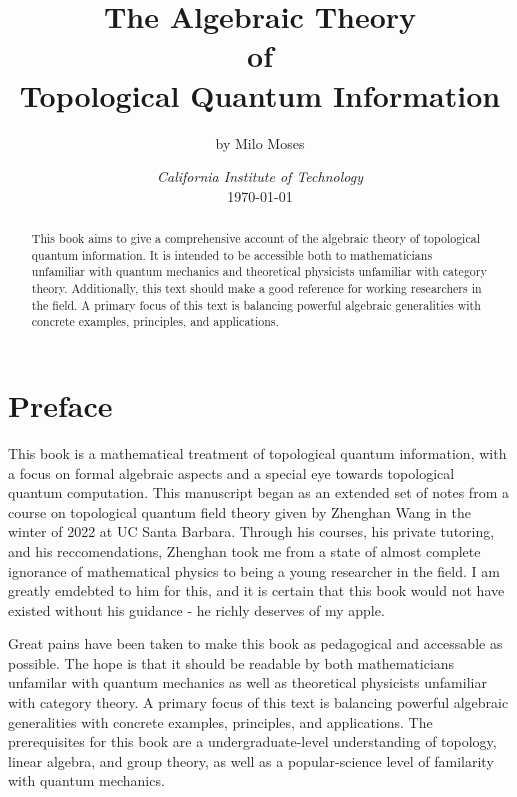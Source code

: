 \documentclass{article}
\title{The Algebraic Theory\\ of \\ Topological Quantum Information}
\author{by Milo Moses}
\date{\textit{California Institute of Technology} \\ [2ex] \today}
\theoremstyle{definition}
\newcommand{\0}{\left|0\right>}
\newcommand{\1}{\left|1\right>}
\numberwithin{figure}{section}
\begin{document}
\maketitle


\begin{abstract}
This book aims to give a comprehensive account of the algebraic theory of topological quantum information. It is intended to be accessible both to mathematicians unfamiliar with quantum mechanics and theoretical physicists unfamiliar with category theory. Additionally, this text should make a good reference for working researchers in the field. A primary focus of this text is balancing powerful algebraic generalities with concrete examples, principles, and applications.
\end{abstract}


\newpage

\tableofcontents

\newpage


\section{Preface}
\label{Preface}

This book is a mathematical treatment of topological quantum information, with a focus on formal algebraic aspects and a special eye towards topological quantum computation. This manuscript began as an extended set of notes from a course on topological quantum field theory given by Zhenghan Wang in the winter of 2022 at UC Santa Barbara. Through his courses, his private tutoring, and his reccomendations, Zhenghan took me from a state of almost complete ignorance of mathematical physics to being a young researcher in the field. I am greatly emdebted to him for this, and it is certain that this book would not have existed without his guidance - he richly deserves of my apple.

Great pains have been taken to make this book as pedagogical and accessable as possible. The hope is that it should be readable by both mathematicians unfamilar with quantum mechanics as well as theoretical physicists unfamiliar with category theory. A primary focus of this text is balancing powerful algebraic generalities with concrete examples, principles, and applications. The prerequisites for this book are a undergraduate-level understanding of topology, linear algebra, and group theory, as well as a popular-science level of familarity with quantum mechanics.
\end{document}

